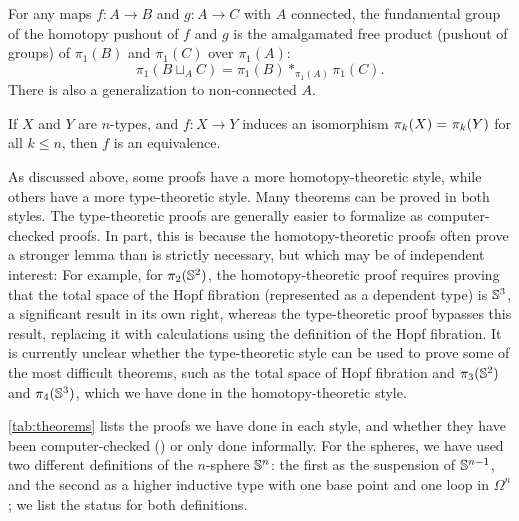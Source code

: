 \begin{thm}
For any maps $f:A\to B$ and $g:A\to C$ with $A$ connected, the fundamental group of the homotopy pushout of $f$ and $g$ is the amalgamated free product (pushout of groups) of $\pi_1(B)$ and $\pi_1(C)$ over $\pi_1(A)$:
\[ \pi_1(B\sqcup_A C) = \pi_1(B) *_{\pi_1(A)} \pi_1(C).\]
There is also a generalization to non-connected $A$.
\end{thm}

\begin{thm}
If $X$ and $Y$ are $n$-types, and $f : X \rightarrow Y$ induces an
isomorphism $\pi_k(X) =_{} \pi_k(Y)$ for all $k \le n$, then $f$ is an
equivalence.
\end{thm}

As discussed above, some proofs have a more homotopy-theoretic style,
while others have a more type-theoretic style.  Many theorems can be
proved in both styles.  The type-theoretic proofs are generally easier
to formalize as computer-checked proofs.  In part, this is because the
homotopy-theoretic proofs often prove a stronger lemma than is strictly
necessary, but which may be of independent interest: For example, for
$\pi_2(\mathbb{S} ^2)$, the homotopy-theoretic proof requires proving that the
total space of the Hopf fibration (represented as a dependent type) is
$\mathbb{S} ^3$, a significant result in its own right, whereas the
type-theoretic proof bypasses this result, replacing it with
calculations using the definition of the Hopf fibration.  It is
currently unclear whether the type-theoretic style can be used to prove
some of the most difficult theorems, such as the total space of Hopf
fibration and $\pi_3(\mathbb{S} ^2)$ and $\pi_4(\mathbb{S} ^3)$, which we have done in
the homotopy-theoretic style.

\autoref{tab:theorems} lists the proofs we have done in each style, and
whether they have been computer-checked (\checkmark) or only done
informally.  For the spheres, we have used two different definitions of
the $n$-sphere $\mathbb{S} ^n$: the first as the suspension of $\mathbb{S} ^ {n-1}$,
and the second as a higher inductive type with one base point and one
loop in $\Omega^n$; we list the status for both definitions.

